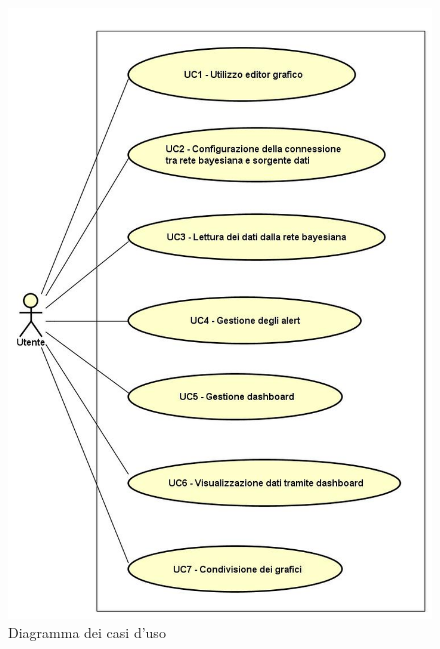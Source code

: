 
\begin{figure} [H]
	\centering
	\includegraphics[scale=0.5]{Img/UC}
	\caption{Diagramma dei casi d'uso}\label{}
\end{figure}
